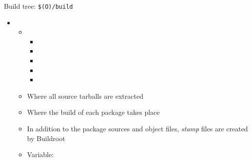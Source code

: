 \begin{frame}{Build tree: {\tt \$(O)/build}}
  \begin{itemize}
  \item {}
    \begin{itemize}
    \item {}
      \begin{itemize}
        \tiny
      \item {}
      \item {}
      \item {}
      \item {}
      \item {}
      \end{itemize}
    \item Where all source tarballs are extracted
    \item Where the build of each package takes place
    \item In addition to the package sources and object files, {\em
        stamp} files are created by Buildroot
    \item Variable: 
    \end{itemize}
  \end{itemize}
\end{frame}

